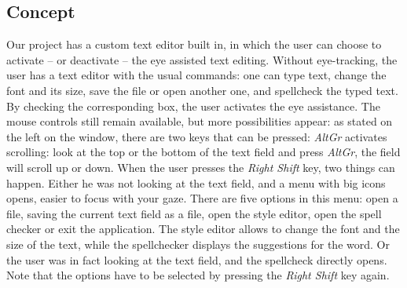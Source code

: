 \documentclass[12pt, a4paper, twoside]{article}
\begin{document}
\subsection{Concept}
Our project has a custom text editor built in, in which the user can choose to activate -- or deactivate -- the eye assisted text editing. Without eye-tracking, the user has a text editor with the usual commands: one can type text, change the font and its size, save the file or open another one, and spellcheck the typed text. By checking the corresponding box, the user activates the eye assistance. The mouse controls still remain available, but more possibilities appear: as stated on the left on the window, there are two keys that can be pressed: \textit{AltGr} activates scrolling: look at the top or the bottom of the text field and press \textit{AltGr}, the field will scroll up or down. When the user presses the \textit{Right Shift} key, two things can happen. Either he was not looking at the text field, and a menu with big icons opens, easier to focus with your gaze. There are five options in this menu: open a file, saving the current text field as a file, open the style editor, open the spell checker or exit the application. The style editor allows to change the font and the size of the text, while the spellchecker displays the suggestions for the word. Or the user was in fact looking at the text field, and the spellcheck directly opens. Note that the options have to be selected by pressing the \textit{Right Shift} key again. 
\end{document}
